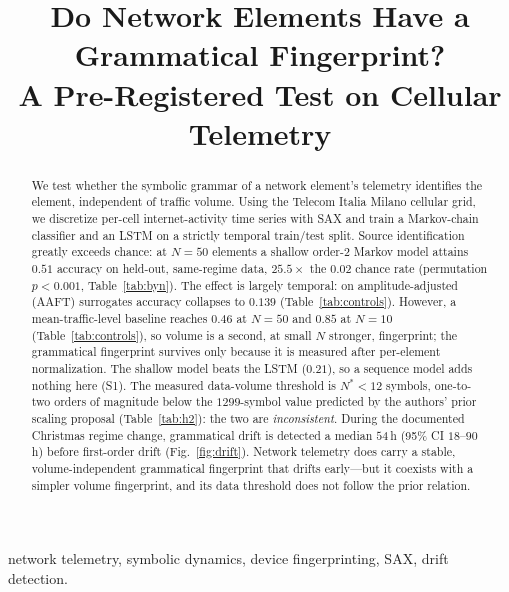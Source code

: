 \documentclass[conference]{IEEEtran}
\begin{document}
\title{Do Network Elements Have a Grammatical Fingerprint?\\
A Pre-Registered Test on Cellular Telemetry}

\author{
}

\maketitle

\begin{abstract}
We test whether the symbolic grammar of a network element's telemetry
identifies the element, independent of traffic volume. Using the Telecom
Italia Milano cellular grid, we discretize per-cell internet-activity time
series with SAX and train a Markov-chain classifier and an LSTM on a strictly
temporal train/test split. Source identification greatly exceeds chance: at
$N{=}50$ elements a shallow order-2 Markov model attains $0.51$ accuracy on
held-out, same-regime data, $25.5\times$ the $0.02$ chance rate (permutation
$p<0.001$, Table~\ref{tab:byn}). The effect is largely temporal: on
amplitude-adjusted (AAFT) surrogates accuracy collapses to $0.139$
(Table~\ref{tab:controls}). However, a mean-traffic-level baseline reaches
$0.46$ at $N{=}50$ and $0.85$ at $N{=}10$ (Table~\ref{tab:controls}), so
volume is a second, at small $N$ stronger, fingerprint; the grammatical
fingerprint survives only because it is measured after per-element
normalization. The shallow model beats the LSTM ($0.21$), so a sequence model
adds nothing here (S1). The measured data-volume threshold is $N^\ast<12$
symbols, one-to-two orders of magnitude below the $1299$-symbol value predicted
by the authors' prior scaling proposal (Table~\ref{tab:h2}): the two are
\emph{inconsistent}. During the documented Christmas regime change, grammatical
drift is detected a median $54$\,h (95\% CI $18$--$90$\,h) before first-order
drift (Fig.~\ref{fig:drift}). Network telemetry does carry a stable,
volume-independent grammatical fingerprint that drifts early---but it coexists
with a simpler volume fingerprint, and its data threshold does not follow the
prior relation.
\end{abstract}

\begin{IEEEkeywords}
network telemetry, symbolic dynamics, device fingerprinting, SAX, drift
detection.
\end{IEEEkeywords}
\end{document}
